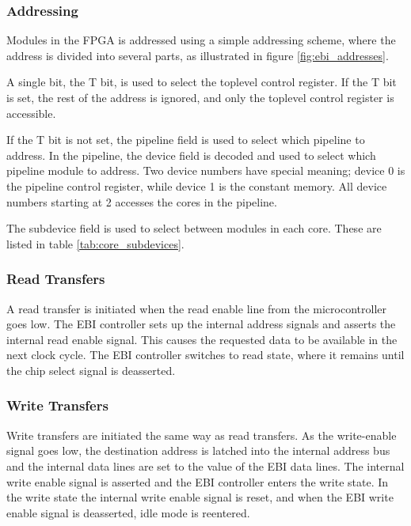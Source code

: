 

\FloatBarrier
\subsubsection{Addressing}

Modules in the FPGA is addressed using a simple addressing scheme, where the
address is divided into several parts, as illustrated in figure \ref{fig:ebi_addresses}.



A single bit, the T bit, is used to select the toplevel control register.
If the T bit is set, the rest of the address is ignored, and only the toplevel
control register is accessible.

If the T bit is not set, the pipeline field is used to select which pipeline
to address. In the pipeline, the device field is decoded and used to select
which pipeline module to address. Two device numbers have special meaning;
device 0 is the pipeline control register, while device 1 is the constant
memory. All device numbers starting at 2 accesses the cores in the pipeline.

The subdevice field is used to select between modules in each core. These
are listed in table \ref{tab:core_subdevices}.



\FloatBarrier
\subsubsection{Read Transfers}

A read transfer is initiated when the read enable line from the microcontroller
goes low. The EBI controller sets up the internal address signals and asserts
the internal read enable signal. This causes the requested data to be available
in the next clock cycle. The EBI controller switches to read state, where it
remains until the chip select signal is deasserted.

\subsubsection{Write Transfers}

Write transfers are initiated the same way as read transfers. As the 
write-enable signal goes low, the destination address is latched into the 
internal address bus and the internal data lines are set to the value of the 
EBI data lines. The internal write enable signal is asserted and the EBI 
controller enters the write state. In the write state the internal write enable 
signal is reset, and when the EBI write enable signal is deasserted, idle mode 
is reentered.
